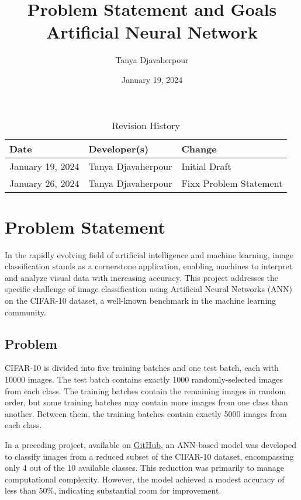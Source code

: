 \documentclass{article}
\title{Problem Statement and Goals\\Artificial Neural Network}
\author{Tanya Djavaherpour}
\date{January 19, 2024}
\begin{document}
\maketitle

\begin{table}[hp]
\caption{Revision History} \label{TblRevisionHistory}
\begin{tabularx}{\textwidth}{llX}
\toprule
\textbf{Date} & \textbf{Developer(s)} & \textbf{Change}\\
\midrule
January 19, 2024 & Tanya Djavaherpour & Initial Draft\\
January 26, 2024 & Tanya Djavaherpour & Fixx Problem Statement\\
\bottomrule
\end{tabularx}
\end{table}

\section{Problem Statement}

In the rapidly evolving field of artificial intelligence and machine learning, image classification 
stands as a cornerstone application, enabling machines to interpret and analyze visual data with 
increasing accuracy. This project addresses the specific challenge of image classification using 
Artificial Neural Networks (ANN) on the CIFAR-10 dataset, a well-known benchmark in the machine learning community.

\subsection{Problem}

CIFAR-10 is divided into five training batches and one test batch, 
each with 10000 images. The test batch contains exactly 1000 randomly-selected 
images from each class. The training batches contain the remaining images in random order, 
but some training batches may contain more images from one class than another. Between them, 
the training batches contain exactly 5000 images from each class.

In a preceding project, available on \href{https://github.com/tanya-jp/CIFAR-Classification/tree/main}{GitHub}, an ANN-based model was developed to classify images 
from a reduced subset of the CIFAR-10 dataset, encompassing only 4 out of the 10 available classes. 
This reduction was primarily to manage computational complexity. However, the model achieved a modest 
accuracy of less than 50\%, indicating substantial room for improvement.
\end{document}

